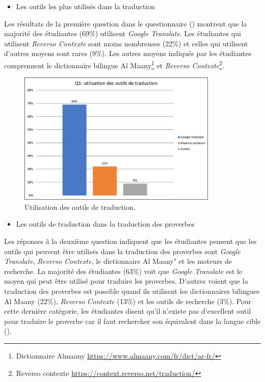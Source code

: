 \documentclass[french]{textolivre}
\begin{document}
\begin{itemize}
    \item Les outils les plus utilisés dans la traduction
\end{itemize}

Les résultats de la première question dans le questionnaire () montrent que la majorité des étudiantes (69\%) utilisent \textit{Google Translate}. 
Les étudiantes qui utilisent \textit{Reverso Contexte} sont moins nombreuses (22\%) et celles qui utilisent d’autres moyens sont rares (9\%). Les autres moyens indiqués par les étudiantes comprennent le dictionnaire bilingue Al Maany\footnote{Dictionnaire Almaany \url{https://www.almaany.com/fr/dict/ar-fr/}} et \textit{Reverso Contexte}\footnote{Reverso contexte \url{https://context.reverso.net/traduction/}}. 

\begin{figure}[htbp]
 \centering
 \includegraphics[width=0.85\textwidth]{Fig1.png}
 \caption{Utilisation des outils de traduction.}
 \label{fig1}
\end{figure}

\begin{itemize}
    \item Les outils de traduction dans la traduction des proverbes
\end{itemize}

Les réponses à la deuxième question indiquent que les étudiantes pensent que les outils qui peuvent être utilisés dans la traduction des proverbes sont \textit{Google Translate}, 
\textit{Reverso Contexte}, le dictionnaire Al Maany" et les moteurs de recherche.  La majorité des étudiantes (63\%) voit que \textit{Google Translate} est le moyen qui peut être utilisé pour traduire les proverbes. D’autres voient que la traduction des proverbes est possible quand ils utilisent les dictionnaires bilingues Al Maany (22\%), 
\textit{Reverso Contexte} (13\%) et les outils de recherche (3\%). Pour cette dernière catégorie, les étudiantes disent qu’il n’existe pas d’excellent outil pour traduire le proverbe car il faut rechercher son équivalent dans la langue cible (). 
\end{document}
